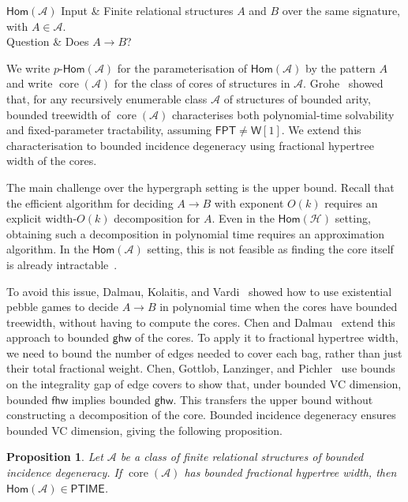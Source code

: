 \documentclass[11pt,letterpaper]{article}
\newtheorem{proposition}[proposition]{Proposition}
\theoremstyle{definition}
\theoremstyle{remark}
\newcommand{\cH}{\mathcal H}
\newcommand{\cA}{\mathcal A}
\newcommand{\Hom}{\mathsf{Hom}}
\newcommand{\pHom}{p\text{-}\mathsf{Hom}}
\newcommand{\ghw}{\mathsf{ghw}}
\newcommand{\fhw}{\mathsf{fhw}}
\newcommand{\FPT}{\ensuremath{\mathsf{FPT}}}
\newcommand{\PTIME}{\mathsf{PTIME}}
\newcommand{\wone}{\ensuremath{\mathsf{W}[1]}}
\providecommand{\fhw}{\operatorname{fhw}}
\providecommand{\FPT}{\ensuremath{\mathsf{FPT}}}
\providecommand{\PTIME}{\mathsf{PTIME}}
\begin{document}
\begin{problem}{$\Hom(\cA)$}
Input & Finite relational structures $A$ and $B$ over the same signature,
with $A\in\cA$.\\
Question & Does $A\to B$?
\end{problem}

We write $\pHom(\cA)$ for the parameterisation of $\Hom(\cA)$ by the pattern $A$ and write $\operatorname{core}(\cA)$ for the class of cores of structures
in $\cA$.
Grohe~\cite{DBLP:journals/jacm/Grohe07} showed that,
for any recursively enumerable class $\cA$ of structures of bounded arity, bounded treewidth
of $\operatorname{core}(\cA)$ characterises both polynomial-time solvability and
fixed-parameter tractability, assuming $\FPT\ne\wone$.
We extend this characterisation to bounded incidence degeneracy using
fractional hypertree width of the cores.

The main challenge over the hypergraph setting is the upper bound. Recall that the efficient algorithm for deciding $A\to B$ with exponent $O(k)$ requires an explicit width-$O(k)$ decomposition for $A$. Even in the $\Hom(\cH)$ setting, obtaining such a decomposition in polynomial time requires an approximation algorithm. In the $\Hom(\cA)$ setting, this is not feasible as finding the core itself is already intractable~\cite{ChandraMerlin77}.

To avoid this issue, Dalmau, Kolaitis, and Vardi~\cite{DalmauKolaitisVardi2002}
showed how to use existential pebble games to decide $A\to B$ in polynomial time
when the cores have bounded treewidth, without having to compute the cores.
Chen and Dalmau~\cite{ChenDalmau2005} extend this approach to bounded
$\ghw$ of the cores. To apply it to fractional
hypertree width, we need to bound the number of edges needed to cover
each bag, rather than just their total fractional weight.
Chen, Gottlob, Lanzinger, and Pichler~\cite[Section~4]{ChenGottlobLanzingerPichler2020} use
bounds on the integrality gap of edge covers to show that, under bounded
VC dimension, bounded $\fhw$ implies bounded $\ghw$.
This transfers the upper bound without constructing a decomposition of
the core. Bounded incidence degeneracy ensures bounded VC dimension,
giving the following proposition.



\begin{proposition}
\label{prop:sparse-core-fhw-ptime}
Let $\cA$ be a class of finite relational structures of bounded incidence
degeneracy. If
$\operatorname{core}(\cA)$ has bounded fractional hypertree width, then
$\Hom(\cA)\in\PTIME$.
\end{proposition}
\end{document}
